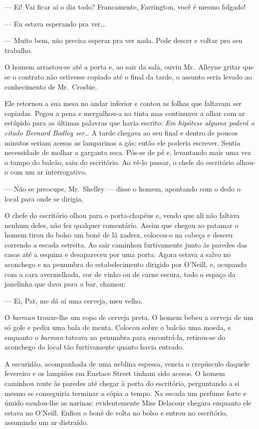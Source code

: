 --- Ei!  Vai ficar aí o dia todo?  Francamente, Farrington, você é mesmo
folgado!

--- Eu estava esperando pra ver\ldots{}

--- Muito bem, não precisa esperar pra ver nada.  Pode descer e voltar pro seu
trabalho.

O homem arrastou-se até a porta e, ao sair da sala, ouviu Mr.~Alleyne gritar
que se o contrato não estivesse copiado até o final da tarde, o assunto seria
levado ao conhecimento de Mr.~Crosbie.

Ele retornou a sua mesa no andar inferior e contou as folhas que faltavam ser
copiadas.  Pegou a pena e mergulhou-a na tinta mas continuava a olhar com ar
estúpido para as últimas palavras que havia escrito: \textit{Em hipótese
alguma poderá o citado Bernard Bodley ser}\ldots{}  A tarde chegava ao
seu final e dentro de poucos minutos seriam acesas as lamparinas a gás: então
ele poderia escrever.  Sentia necessidade de molhar a garganta seca.  Pôs-se de
pé e, levantando mais uma vez o tampo do balcão, saiu do escritório.  Ao vê-lo
passar, o chefe do escritório olhou-o com um ar interrogativo.

--- Não se preocupe, Mr.~Shelley --- disse o homem, apontando com o dedo o
local para onde se dirigia.

O chefe do escritório olhou para o porta-chapéus e, vendo que ali não faltava
nenhum deles, não fez qualquer comentário.  Assim que chegou ao patamar o homem
tirou do bolso um boné de lã xadrez, colocou-o na cabeça e desceu correndo a
escada estreita.  Ao sair caminhou furtivamente junto às paredes das casas até
a esquina e desapareceu por uma porta.  Agora estava a salvo no aconchego e na
penumbra do estabelecimento dirigido por O’Neill, e, ocupando com a cara
avermelhada, cor de vinho ou de carne escura, todo o espaço da janelinha que
dava para o bar, chamou:

--- Ei, Pat, me dá aí uma cerveja, meu velho.

O \textit{barman} trouxe-lhe um copo de cerveja preta.  O homem bebeu a cerveja
de um só gole e pediu uma bala de menta.  Colocou sobre o balcão uma moeda, e
enquanto o \textit{barman} tateava na penumbra para encontrá-la, retirou-se do
aconchego do local tão furtivamente quanto havia entrado.

A escuridão, acompanhada de uma neblina espessa, vencia o crepúsculo daquele
fevereiro e os lampiões em Eustace Street tinham sido acesos.  O homem caminhou
rente às paredes até chegar à porta do escritório, perguntando a si mesmo se
conseguiria terminar a cópia a tempo.  Na escada um perfume forte e úmido
saudou-lhe as narinas: evidentemente Miss Delacour chegara enquanto ele estava
no O’Neill.  Enfiou o boné de volta no bolso e entrou no escritório, assumindo
um ar distraído.

